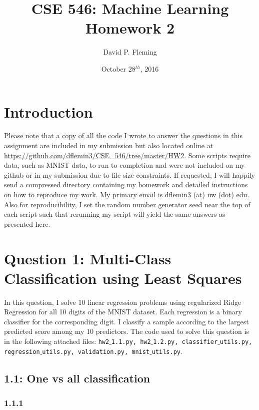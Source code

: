 \documentclass[12pt]{amsart}
\title{CSE 546: Machine Learning Homework 2}
\author{David P. Fleming}
\date{October 28$^{th}$, 2016}
\begin{document}
\maketitle
\tableofcontents

\section*{Introduction}

Please note that a copy of all the code I wrote to answer the questions in this assignment are included in my submission but also located online at \url{https://github.com/dflemin3/CSE_546/tree/master/HW2}.  Some scripts require data, such as MNIST data, to run to completion and were not included on my github or in my submission due to file size constraints.  If requested, I will happily send a compressed directory containing my homework and detailed instructions on how to reproduce my work.  My primary email is dflemin3 (at) uw (dot) edu.  Also for reproducibility, I set the random number generator seed near the top of each script such that rerunning my script will yield the same answers as presented here.


\section*{Question 1: Multi-Class Classification using Least Squares}

In this question, I solve 10 linear regression problems using regularized Ridge Regression for all 10 digits of the MNIST dataset.  Each regression is a binary classifier for the corresponding digit.  I classify a sample according to the largest predicted score among my 10 predictors.  The code used to solve this question is in the following attached files: {\tt hw2$\_$1.1.py, hw2$\_$1.2.py, classifier$\_$utils.py, regression$\_$utils.py,
validation.py, mnist$\_$utils.py}.

\subsection*{1.1: One vs all classification}

\subsubsection*{1.1.1}
\end{document}
